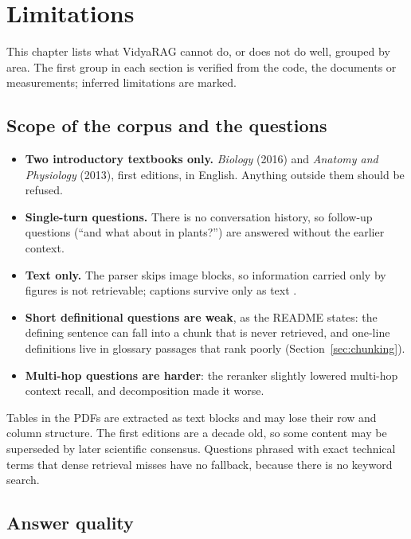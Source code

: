 \chapter{Limitations}
\label{ch:limitations}

This chapter lists what VidyaRAG cannot do, or does not do well, grouped by area. The first group in each section is verified from the code, the documents or measurements; inferred limitations are marked.

\section{Scope of the corpus and the questions}

\begin{itemize}
  \item \textbf{Two introductory textbooks only.} \emph{Biology} (2016) and \emph{Anatomy and Physiology} (2013), first editions, in English. Anything outside them should be refused.
  \item \textbf{Single-turn questions.} There is no conversation history, so follow-up questions (\enquote{and what about in plants?}) are answered without the earlier context.
  \item \textbf{Text only.} The parser skips image blocks, so information carried only by figures is not retrievable; captions survive only as text .
  \item \textbf{Short definitional questions are weak}, as the README states: the defining sentence can fall into a chunk that is never retrieved, and one-line definitions live in glossary passages that rank poorly (Section~\ref{sec:chunking}).
  \item \textbf{Multi-hop questions are harder}: the reranker slightly lowered multi-hop context recall, and decomposition made it worse.
\end{itemize}

\begin{inferred}
Tables in the PDFs are extracted as text blocks and may lose their row and column structure. The first editions are a decade old, so some content may be superseded by later scientific consensus. Questions phrased with exact technical terms that dense retrieval misses have no fallback, because there is no keyword search.
\end{inferred}

\section{Answer quality}

